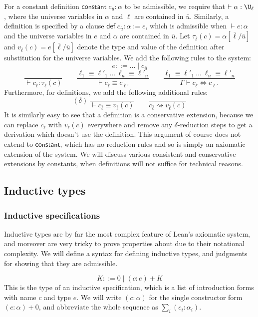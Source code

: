 For a constant definition $\mathsf{constant}\;c_{\bar u}:\alpha$ to be admissible, we require that $\vdash\alpha:\U_\ell$, where the universe variables in $\alpha$ and $\ell$ are contained in $\bar u$. Similarly, a definition is specified by a clause $\mathsf{def}\;c_{\bar u}:\alpha:=e$, which is admissible when $\vdash e:\alpha$ and the universe variables in $e$ and $\alpha$ are contained in $\bar u$. Let $\tau_{\bar\ell}(c)=\alpha[\bar\ell/\bar u]$ and $v_{\bar\ell}(c)=e[\bar\ell/\bar u]$ denote the type and value of the definition after substitution for the universe variables. We add the following rules to the system:
$$e::=\dots\mid c_{\bar u}$$
$$\frac{}{\vdash c_{\bar\ell}:\tau_{\bar\ell}(c)}\qquad
\frac{\ell_1\equiv\ell'_1\ \dots\ \ell_n\equiv\ell'_n}{\vdash c_{\bar\ell}\equiv c_{\bar\ell'}}\qquad\frac{\ell_1\equiv\ell'_1\ \dots\ \ell_n\equiv\ell'_n}{\Gamma\vdash c_{\bar\ell}\Leftrightarrow c_{\bar\ell'}}$$
Furthermore, for definitions, we add the following additional rules:
$$(\delta)\ \frac{}{\vdash c_{\bar\ell}\equiv v_{\bar\ell}(c)}\qquad
\frac{}{c_{\bar\ell}\rightsquigarrow v_{\bar\ell}(c)}$$
It is similarly easy to see that a definition is a conservative extension, because we can replace $c_{\bar\ell}$ with $v_{\bar\ell}(c)$ everywhere and remove any $\delta$-reduction steps to get a derivation which doesn't use the definition. This argument of course does not extend to $\mathsf{constant}$, which has no reduction rules and so is simply an axiomatic extension of the system. We will discuss various consistent and conservative extensions by constants, when definitions will not suffice for technical reasons.
\vfill
\pagebreak

\subsection{Inductive types}\label{sec:inductive}

\subsubsection{Inductive specifications}
Inductive types are by far the most complex feature of Lean's axiomatic system, and moreover are very tricky to prove properties about due to their notational complexity. We will define a syntax for defining inductive types, and judgments for showing that they are admissible.

$$K::=0\mid (c:e)+K$$
This is the type of an inductive specification, which is a list of introduction forms with name $c$ and type $e$. We will write $(c:\alpha)$ for the single constructor form $(c:\alpha)+0$, and abbreviate the whole sequence as $\sum_i(c_i:\alpha_i)$.


